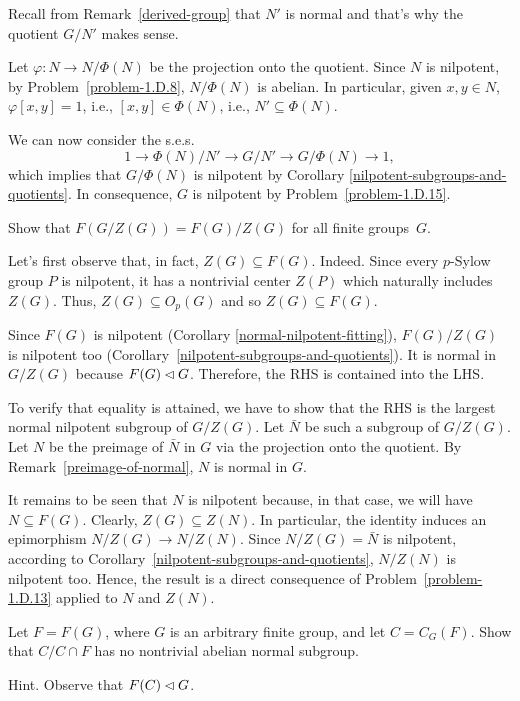 \begin{solution} Recall from Remark~\ref{derived-group} that $N'$ is normal and that's why the quotient $G/N'$ makes sense.

Let $\varphi\colon N\to N/\Phi(N)$ be the projection onto the quotient. Since $N$ is nilpotent, by Problem~\ref{problem-1.D.8}, $N/\Phi(N)$ is abelian. In particular, given $x,y\in N$, $\varphi[x,y]=1$, i.e., $[x,y]\in\Phi(N)$, i.e., $N'\subseteq\Phi(N)$.

We can now consider the s.e.s.
$$
    1\to \Phi(N)/N'\to G/N'\to G/\Phi(N)\to 1,
$$
which implies that $G/\Phi(N)$ is nilpotent by Corollary \ref{nilpotent-subgroups-and-quotients}. In consequence, $G$ is nilpotent by Problem~\ref{problem-1.D.15}.

\end{solution}

\begin{probl}
    Show that $F(G/Z(G)) = F(G)/Z(G)$ for all finite groups~$G$.
\end{probl}

\begin{solution} Let's first observe that, in fact, $Z(G)\subseteq F(G)$. Indeed. Since every $p$-Sylow group $P$ is nilpotent, it has a nontrivial center $Z(P)$ which naturally includes $Z(G)$. Thus, $Z(G)\subseteq O_p(G)$ and so $Z(G)\subseteq F(G)$.

Since $F(G)$ is nilpotent (Corollary \ref{normal-nilpotent-fitting}), $F(G)/Z(G)$ is nilpotent too (Corollary~\ref{nilpotent-subgroups-and-quotients}). It is normal in $G/Z(G)$ because $F(G)\lhd G$. Therefore, the RHS is contained into the LHS.

To verify that equality is attained, we have to show that the RHS is the largest normal nilpotent subgroup of $G/Z(G)$. Let $\bar N$ be such a subgroup of $G/Z(G)$. Let $N$ be the preimage of $\bar N$ in $G$ via the projection onto the quotient. By Remark~\ref{preimage-of-normal}, $N$ is normal in $G$.

It remains to be seen that $N$ is nilpotent because, in that case, we will have $N\subseteq F(G)$. Clearly, $Z(G)\subseteq Z(N)$. In particular, the identity induces an epimorphism $N/Z(G)\to N/Z(N)$. Since $N/Z(G)=\bar N$ is nilpotent, according to Corollary~\ref{nilpotent-subgroups-and-quotients}, $N/Z(N)$ is nilpotent too. Hence, the result is a direct consequence of Problem~\ref{problem-1.D.13} applied to $N$ and $Z(N)$.  \end{solution}

\begin{probl}\label{problem-1.D.19}
    Let $F = F(G)$, where $G$ is an arbitrary finite group, and let $C = C_G(F)$. Show that $C/C\cap F$ has no nontrivial abelian normal subgroup.

    \textrm{\upshape Hint. Observe that $F(C)\lhd G$.}
\end{probl}

